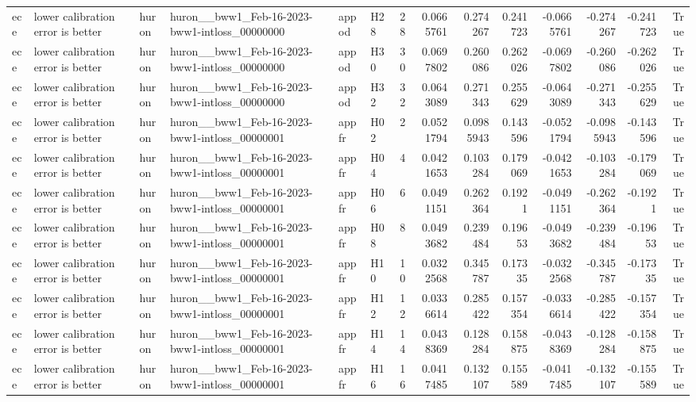 \begin{longtable}{llllllrrrrrrrr}
ece & lower calibration error is better & huron & huron\_\_bww1\_Feb-16-2023-bww1-intloss\_00000000 & appod & H28 & 28 & 0.0665761 & 0.274267 & 0.241723 & -0.0665761 & -0.274267 & -0.241723 & True \\
ece & lower calibration error is better & huron & huron\_\_bww1\_Feb-16-2023-bww1-intloss\_00000000 & appod & H30 & 30 & 0.0697802 & 0.260086 & 0.262026 & -0.0697802 & -0.260086 & -0.262026 & True \\
ece & lower calibration error is better & huron & huron\_\_bww1\_Feb-16-2023-bww1-intloss\_00000000 & appod & H32 & 32 & 0.0643089 & 0.271343 & 0.255629 & -0.0643089 & -0.271343 & -0.255629 & True \\
ece & lower calibration error is better & huron & huron\_\_bww1\_Feb-16-2023-bww1-intloss\_00000001 & appfr & H02 & 2 & 0.0521794 & 0.0985943 & 0.143596 & -0.0521794 & -0.0985943 & -0.143596 & True \\
ece & lower calibration error is better & huron & huron\_\_bww1\_Feb-16-2023-bww1-intloss\_00000001 & appfr & H04 & 4 & 0.0421653 & 0.103284 & 0.179069 & -0.0421653 & -0.103284 & -0.179069 & True \\
ece & lower calibration error is better & huron & huron\_\_bww1\_Feb-16-2023-bww1-intloss\_00000001 & appfr & H06 & 6 & 0.0491151 & 0.262364 & 0.1921 & -0.0491151 & -0.262364 & -0.1921 & True \\
ece & lower calibration error is better & huron & huron\_\_bww1\_Feb-16-2023-bww1-intloss\_00000001 & appfr & H08 & 8 & 0.0493682 & 0.239484 & 0.19653 & -0.0493682 & -0.239484 & -0.19653 & True \\
ece & lower calibration error is better & huron & huron\_\_bww1\_Feb-16-2023-bww1-intloss\_00000001 & appfr & H10 & 10 & 0.0322568 & 0.345787 & 0.17335 & -0.0322568 & -0.345787 & -0.17335 & True \\
ece & lower calibration error is better & huron & huron\_\_bww1\_Feb-16-2023-bww1-intloss\_00000001 & appfr & H12 & 12 & 0.0336614 & 0.285422 & 0.157354 & -0.0336614 & -0.285422 & -0.157354 & True \\
ece & lower calibration error is better & huron & huron\_\_bww1\_Feb-16-2023-bww1-intloss\_00000001 & appfr & H14 & 14 & 0.0438369 & 0.128284 & 0.158875 & -0.0438369 & -0.128284 & -0.158875 & True \\
ece & lower calibration error is better & huron & huron\_\_bww1\_Feb-16-2023-bww1-intloss\_00000001 & appfr & H16 & 16 & 0.0417485 & 0.132107 & 0.155589 & -0.0417485 & -0.132107 & -0.155589 & True \\

\end{longtable}
